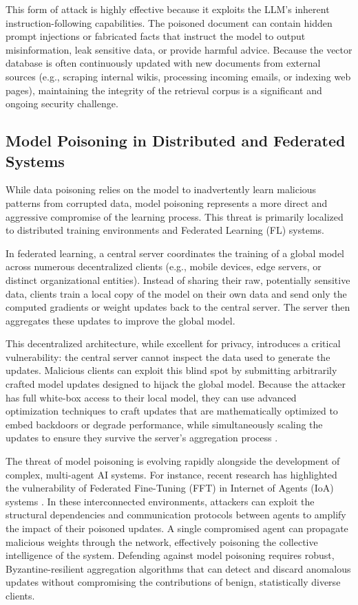 \documentclass[11pt,a4paper]{article}
\begin{document}
This form of attack is highly effective because it exploits the LLM's inherent instruction-following capabilities. The poisoned document can contain hidden prompt injections or fabricated facts that instruct the model to output misinformation, leak sensitive data, or provide harmful advice. Because the vector database is often continuously updated with new documents from external sources (e.g., scraping internal wikis, processing incoming emails, or indexing web pages), maintaining the integrity of the retrieval corpus is a significant and ongoing security challenge.

\subsection{Model Poisoning in Distributed and Federated Systems}

While data poisoning relies on the model to inadvertently learn malicious patterns from corrupted data, model poisoning represents a more direct and aggressive compromise of the learning process. This threat is primarily localized to distributed training environments and Federated Learning (FL) systems. 

In federated learning, a central server coordinates the training of a global model across numerous decentralized clients (e.g., mobile devices, edge servers, or distinct organizational entities). Instead of sharing their raw, potentially sensitive data, clients train a local copy of the model on their own data and send only the computed gradients or weight updates back to the central server. The server then aggregates these updates to improve the global model. 

This decentralized architecture, while excellent for privacy, introduces a critical vulnerability: the central server cannot inspect the data used to generate the updates. Malicious clients can exploit this blind spot by submitting arbitrarily crafted model updates designed to hijack the global model. Because the attacker has full white-box access to their local model, they can use advanced optimization techniques to craft updates that are mathematically optimized to embed backdoors or degrade performance, while simultaneously scaling the updates to ensure they survive the server's aggregation process \cite{Zhao_2026_Protegofed, Kuchler_2025_Architectural}.

The threat of model poisoning is evolving rapidly alongside the development of complex, multi-agent AI systems. For instance, recent research has highlighted the vulnerability of Federated Fine-Tuning (FFT) in Internet of Agents (IoA) systems \cite{Cai_2025_Graph}. In these interconnected environments, attackers can exploit the structural dependencies and communication protocols between agents to amplify the impact of their poisoned updates. A single compromised agent can propagate malicious weights through the network, effectively poisoning the collective intelligence of the system. Defending against model poisoning requires robust, Byzantine-resilient aggregation algorithms that can detect and discard anomalous updates without compromising the contributions of benign, statistically diverse clients.
\end{document}
